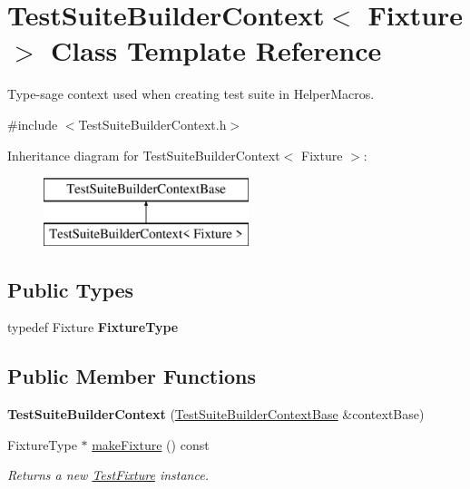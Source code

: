 \hypertarget{class_test_suite_builder_context}{}\section{Test\+Suite\+Builder\+Context$<$ Fixture $>$ Class Template Reference}
\label{class_test_suite_builder_context}


Type-\/sage context used when creating test suite in Helper\+Macros.  




{\ttfamily \#include $<$Test\+Suite\+Builder\+Context.\+h$>$}

Inheritance diagram for Test\+Suite\+Builder\+Context$<$ Fixture $>$\+:\begin{figure}[H]
\begin{center}
\leavevmode
\includegraphics[height=2.000000cm]{class_test_suite_builder_context}
\end{center}
\end{figure}
\subsection*{Public Types}
\begin{DoxyCompactItemize}
\item 
typedef Fixture {\bfseries Fixture\+Type}\hypertarget{class_test_suite_builder_context_a994528427c211ca187b39a9345ea53ee}{}\label{class_test_suite_builder_context_a994528427c211ca187b39a9345ea53ee}

\end{DoxyCompactItemize}
\subsection*{Public Member Functions}
\begin{DoxyCompactItemize}
\item 
{\bfseries Test\+Suite\+Builder\+Context} (\hyperlink{class_test_suite_builder_context_base}{Test\+Suite\+Builder\+Context\+Base} \&context\+Base)\hypertarget{class_test_suite_builder_context_a51c0c0c846df2790ea1866c61e9b3e39}{}\label{class_test_suite_builder_context_a51c0c0c846df2790ea1866c61e9b3e39}

\item 
Fixture\+Type $\ast$ \hyperlink{class_test_suite_builder_context_a8f5c2fa277582411aa49bfbbe6d72d11}{make\+Fixture} () const 
\begin{DoxyCompactList}\small\item\em Returns a new \hyperlink{class_test_fixture}{Test\+Fixture} instance. \end{DoxyCompactList}\end{DoxyCompactItemize}
